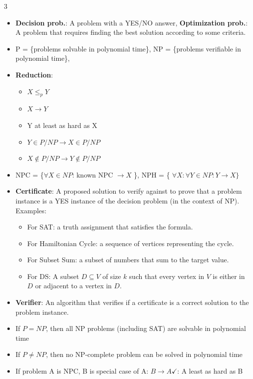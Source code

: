 \documentclass[letterpaper]{article}
\begin{document}
\begin{multicols*}{3}
    \begin{itemize}
        \item \textbf{Decision prob.}: A problem with a YES/NO answer, \textbf{Optimization prob.}: A problem that requires finding the best solution according to some criteria.
        \item P = \{problems solvable in polynomial time\}, NP = \{problems verifiable in polynomial time\},
        \item \textbf{Reduction}:
              \begin{itemize}
                  \item $X \leq_p Y$
                  \item $X \to Y$
                  \item Y at least as hard as X
                  \item $Y \in P/NP \to X \in P/NP$
                  \item $X \notin P/NP \to Y \notin P/NP$
              \end{itemize}
        \item NPC = \{$\forall X \in NP$: known NPC $\to X$ \}, NPH = \{ $\forall X: \forall Y \in NP : Y \to X \}$
        \item \textbf{Certificate}: A proposed solution to verify against to prove that a problem instance is a YES instance of the decision problem (in the context of NP).
              \\Examples:
              \begin{itemize}
                  \item For SAT: a truth assignment that satisfies the formula.
                  \item For Hamiltonian Cycle: a sequence of vertices representing the cycle.
                  \item For Subset Sum: a subset of numbers that sum to the target value.
                  \item For DS: A subset $D \subseteq V$ of size $k$ such that every vertex in $V$ is either in $D$ or adjacent to a vertex in $D$.
              \end{itemize}
        \item \textbf{Verifier}: An algorithm that verifies if a certificate is a correct solution to the problem instance.
    \end{itemize}
    \begin{itemize}
        \item If $P=NP$, then all NP problems (including SAT) are solvable in polynomial time
        \item If $P \ne NP$, then no NP-complete problem can be solved in polynomial time
        \item If problem A is NPC, B is special case of A: $B \to A \checkmark$: A least as hard as B
    \end{itemize}


\end{multicols*}
\end{document}
